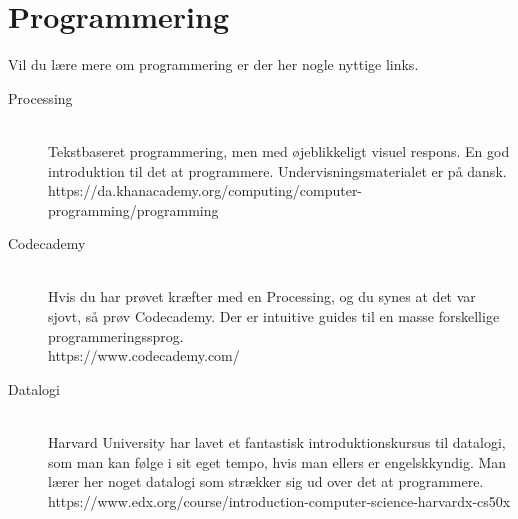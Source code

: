 \documentclass[11pt]{article}
\begin{document}
\section{Programmering}
Vil du lære mere om programmering er der her nogle nyttige links.
\begin{description}
    \item[Processing]~\\
        Tekstbaseret programmering, men med øjeblikkeligt visuel respons. En god introduktion til det at programmere. Undervisningsmaterialet er på dansk. \\
        https://da.khanacademy.org/computing/computer-programming/programming
    \item[Codecademy]~\\
        Hvis du har prøvet kræfter med en Processing, og du synes at det var sjovt, så prøv Codecademy. Der er intuitive guides til en masse forskellige programmeringssprog. \\ https://www.codecademy.com/
    \item[Datalogi]~\\
        Harvard University har lavet et fantastisk introduktionskursus til datalogi, som man kan følge i sit eget tempo, hvis man ellers er engelskkyndig. Man lærer her noget datalogi som strækker sig ud over det at programmere. \\
        https://www.edx.org/course/introduction-computer-science-harvardx-cs50x
\end{description}
\end{document}
